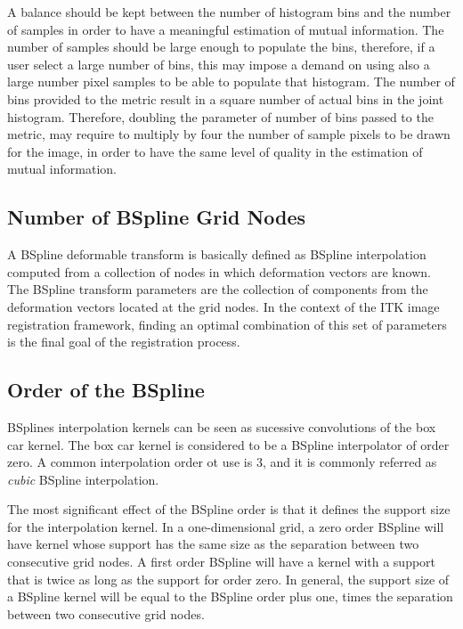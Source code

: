 \documentclass{InsightArticle}
\begin{document}
A balance should be kept between the number of histogram bins and the number of
samples in order to have a meaningful estimation of mutual information. The
number of samples should be large enough to populate the bins, therefore, if a
user select a large number of bins, this may impose a demand on using also a
large number pixel samples to be able to populate that histogram. The number of
bins provided to the metric result in a square number of actual bins in the joint
histogram. Therefore, doubling the parameter of number of bins passed to the
metric, may require to multiply by four the number of sample pixels to be drawn
for the image, in order to have the same level of quality in the estimation of
mutual information.


\subsection{Number of BSpline Grid Nodes}

A BSpline deformable transform is basically defined as BSpline interpolation
computed from a collection of nodes in which deformation vectors are known.
The BSpline transform parameters are the collection of components from the
deformation vectors located at the grid nodes. In the context of the ITK image
registration framework, finding an optimal combination of this set of
parameters is the final goal of the registration process.

\subsection{Order of the BSpline}
\label{sec:BSplineOrder}

BSplines interpolation kernels can be seen as sucessive convolutions of the box
car kernel. The box car kernel is considered to be a BSpline interpolator of
order zero. A common interpolation order ot use is $3$, and it is commonly
referred as \emph{cubic} BSpline interpolation.

The most significant effect of the BSpline order is that it defines the support
size for the interpolation kernel. In a one-dimensional grid, a zero order
BSpline will have kernel whose support has the same size as the separation
between two consecutive grid nodes. A first order BSpline will have a kernel
with a support that is twice as long as the support for order zero. In general,
the support size of a BSpline kernel will be equal to the BSpline order plus
one, times the separation between two consecutive grid nodes.
\end{document}
